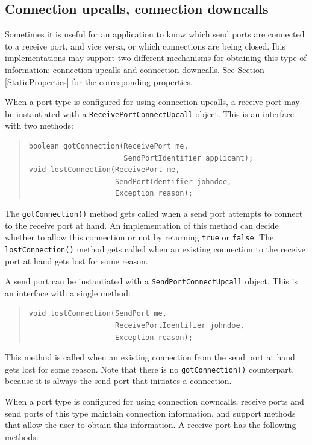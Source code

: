 \documentclass[10pt]{article}
\newcommand{\mysubsection}[1]{\subsection{#1}\label{#1}}
\begin{document}
\mysubsection{Connection upcalls, connection downcalls}

Sometimes it is useful for an application to know which send ports
are connected to a receive port, and vice versa, or which connections
are being closed.
Ibis implementations may support two different mechanisms for obtaining
this type of information: connection upcalls and connection downcalls.
See Section \ref{StaticProperties} for the corresponding properties.

When a port type is configured for using connection upcalls,
a receive port may be instantiated with a \texttt{ReceivePortConnectUpcall}
object. This is an interface with two methods:

{\small
\begin{quote}
\begin{verbatim}
boolean gotConnection(ReceivePort me,
                      SendPortIdentifier applicant);
void lostConnection(ReceivePort me,
                    SendPortIdentifier johndoe,
                    Exception reason);
\end{verbatim}
\end{quote}
}
\noindent 
The \texttt{gotConnection()} method gets called when a send port attempts
to connect to the receive port at hand.
An implementation of this method can decide whether
to allow this connection or not by returning \texttt{true} or \texttt{false}.
The \texttt{lostConnection()} method gets called when an existing connection
to the receive port at hand gets lost for some reason.

A send port can be instantiated with a
\texttt{SendPortConnectUpcall} object. This is an interface with a single method:

{\small
\begin{quote}
\begin{verbatim}
void lostConnection(SendPort me,
                    ReceivePortIdentifier johndoe,
                    Exception reason);
\end{verbatim}
\end{quote}
}
\noindent 
This method is called when an existing connection from the send port at
hand gets lost for some reason. Note that there is no \texttt{gotConnection()}
counterpart, because it is always the send port that initiates a connection.

When a port type is configured for using connection downcalls, receive ports
and send ports of this type maintain connection information, and support
methods that allow the user to obtain this information.
A receive port has the following methods:
\end{document}
